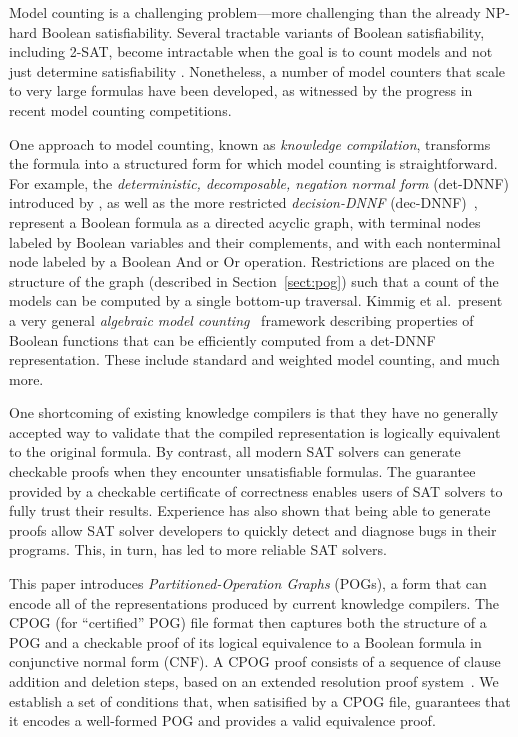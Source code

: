 \documentclass[twoside,11pt]{article}
\begin{document}
Model counting is a challenging problem---more challenging than the
already NP-hard Boolean satisfiability.  Several
tractable variants of Boolean satisfiability, including 2-SAT, become
intractable when the goal is to count models and not just determine
satisfiability \cite{valiant:siam:1979}.  Nonetheless, a number of
model counters that scale to very large formulas have been developed, as
witnessed by the progress in recent model counting competitions.

One approach to model counting, known as \emph{knowledge compilation},
transforms the formula into a structured form for which model counting
is straightforward.  For example, the \emph{deterministic, decomposable, negation normal form}
(det-DNNF) introduced by
, as well as the more restricted
\emph{decision-DNNF} (dec-DNNF)~\cite{huang:jair:2007,oztok:cp:2014},
represent a
Boolean formula as a directed acyclic graph, with terminal nodes
labeled by Boolean variables and their complements, and with each
nonterminal node labeled by a Boolean And or Or operation.  Restrictions
are placed on the structure of the graph (described in Section~\ref{sect:pog}) such that a count of the
models can be computed by a single bottom-up traversal.
Kimmig et al.\ present a very general {\em
  algebraic model counting}~\cite{kimmig:jal:2017} framework describing
properties of Boolean functions that can be efficiently computed from
a det-DNNF representation.  These include standard and weighted model
counting, and much more.

One shortcoming of existing knowledge compilers is that they have no
generally accepted
way to validate that
the compiled representation is logically equivalent to the original
formula.  By contrast, all modern SAT solvers can generate
checkable proofs when they encounter unsatisfiable formulas.  The
guarantee provided by a checkable certificate of correctness enables
users of SAT solvers to fully trust their results.  Experience has also
shown that being able to generate proofs allow SAT solver developers to quickly
detect and diagnose bugs in their programs. This, in turn, has led
to more reliable SAT solvers.

This paper introduces \emph{Partitioned-Operation Graphs} (POGs),
a form that can encode all of the representations produced by current knowledge
compilers. The CPOG (for ``certified'' POG) file format then
captures both the structure of a POG
and a checkable proof of its logical equivalence to a Boolean formula in
conjunctive normal form (CNF).  A CPOG
proof consists of a sequence of clause addition and deletion steps,
based on an extended resolution proof system~\cite{Tseitin:1983}.
We establish a set of conditions that, when satisified by a CPOG file, guarantees that it
encodes a well-formed POG and provides a valid equivalence proof.
\end{document}
